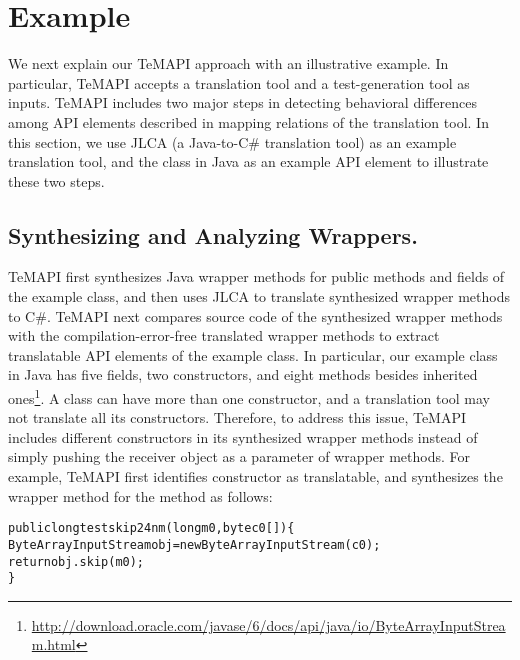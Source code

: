 \section{Example}
\label{sec:example}

We next explain our TeMAPI approach with an illustrative example. In particular, TeMAPI accepts a translation tool and a test-generation tool as inputs. TeMAPI includes two major steps in detecting behavioral differences among API elements described in mapping relations of the translation tool. In this section, we use JLCA (a Java-to-C\# translation tool) as an example translation tool, and the  class in Java as an example API element to illustrate these two steps.


\subsection{Synthesizing and Analyzing Wrappers.} TeMAPI first synthesizes Java wrapper methods for public methods and fields of the example class, and then uses JLCA to translate synthesized wrapper methods to C\#. TeMAPI next compares source code of the synthesized wrapper methods with the compilation-error-free translated wrapper methods to extract translatable API elements of the example class. In particular, our example class in Java has five fields, two constructors, and eight methods besides inherited ones\footnote{\url{http://download.oracle.com/javase/6/docs/api/java/io/ByteArrayInputStream.html}}. A class can have more than one constructor, and a translation tool may not translate all its constructors. Therefore, to address this issue, TeMAPI includes different constructors in its synthesized wrapper methods instead of simply pushing the receiver object as a parameter of wrapper methods. For example, TeMAPI first identifies  constructor as translatable, and synthesizes the wrapper method for the  method as follows:

\begin{CodeOut}%
\begin{alltt}
public long testskip24nm(long m0, byte c0[])\{
  ByteArrayInputStream obj = new ByteArrayInputStream(c0);
  return obj.skip(m0);
\}
\end{alltt}
\end{CodeOut}%


